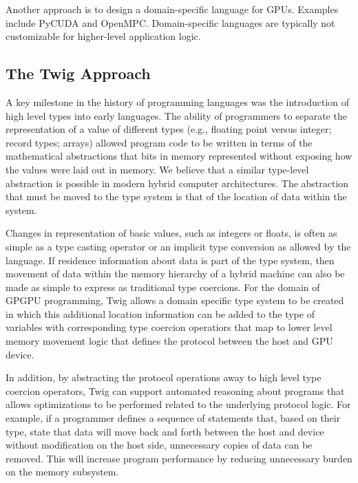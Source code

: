 \documentclass[11pt]{article}
\begin{document}
Another approach is to design a domain-specific language for GPUs. Examples
include PyCUDA and OpenMPC. Domain-specific languages are typically not
customizable for higher-level application logic.

\subsection{The Twig Approach}


A key milestone in the history of programming languages was the
introduction of high level types into early languages.  The ability of
programmers to separate the representation of a value of different
types (e.g., floating point versus integer; record types; arrays)
allowed program code to be written in terms of the mathematical
abstractions that bits in memory represented without exposing how the
values were laid out in memory.  We believe that a similar type-level
abstraction is possible in modern hybrid computer architectures.  The
abstraction that must be moved to the type system is that of the location
of data within the system.  

Changes in representation of basic values, such as integers or floats, is
often as simple as a type casting operator or an implicit type conversion
as allowed by the language.  If residence information about data is part of
the type system, then movement of data within the memory hierarchy of a hybrid
machine can also be made as simple to express as traditional type coercions.
For the domain of GPGPU programming, Twig allows a domain specific type
system to be created in which this additional location information can be 
added to the type of variables with corresponding type coercion operatiors
that map to lower level memory movement logic that defines the protocol between
the host and GPU device.

In addition, by abstracting the protocol operations away to high level
type coercion operators, Twig can support automated reasoning about
programs that allows optimizations to be performed related to the underlying
protocol logic.  For example, if a programmer defines a sequence of
statements that, based on their type, state that data will move back and forth
between the host and device without modification on the host side, unnecessary
copies of data can be removed.  This will increase program performance by
reducing unnecessary burden on the memory subsystem.
\end{document}
